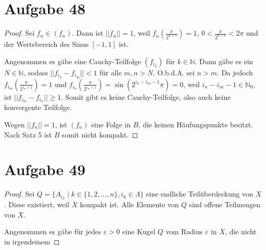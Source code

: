 \documentclass[10pt,a4paper]{article}
\begin{document}
\section{Aufgabe 48}

\begin{proof}
  Sei $f_{n} \in (f_{n})$.
  Dann ist $||f_{n}|| = 1$, weil $f_{n}(\frac{\pi}{2^{n + 1}}) = 1$, $0 < \frac{\pi}{2^{n + 1}} < 2\pi$ und der Wertebereich des Sinus $[-1, 1]$ ist.

  Angenommen es gäbe eine Cauchy-Teilfolge $(f_{i_{k}})$ für $k \in \mathbb{N}$.
  Dann gäbe es ein $N \in \mathbb{N}$, sodass $||f_{i_{n}} - f_{i_{m}}|| < 1$ für alle $m, n > N$.
  O.b.d.A. sei $n > m$.
  Da jedoch $f_{i_{m}}(\frac{\pi}{2^{i_{m} + 1}}) = 1$ und $f_{i_{n}}(\frac{\pi}{2^{i_{m} + 1}}) = \sin(2^{i_{n} - i_{m} - 1}\pi) = 0$, weil $i_{n} - i_{m} - 1 \in \mathbb{N}_{0}$, ist $||f_{i_{m}} - f_{i_{n}}|| \ge 1$.
  Somit gibt es keine Cauchy-Teilfolge, also auch keine konvergente Teilfolge.

  Wegen $||f_{n}|| = 1$, ist $(f_{n})$ eine Folge in $B$, die keinen Häufungspunkte besitzt.
  Nach Satz 5 ist $B$ somit nicht kompakt.
\end{proof}

\section{Aufgabe 49}

\begin{proof}
  Sei $Q = \{ A_{i_{k}} \mid k \in \{ 1, 2, \dots, n \}, i_{k} \in \Lambda \}$ eine endliche Teilüberdeckung von $X$.
  Diese existiert, weil $X$ kompakt ist.
  Alle Elemente von $Q$ sind offene Teilmengen von $X$.

  Angenommen es gäbe für jedes $\varepsilon > 0$ eine Kugel $Q$ vom Radius $\varepsilon$ in $X$, die nicht in irgendeinem
\end{proof}
\end{document}

